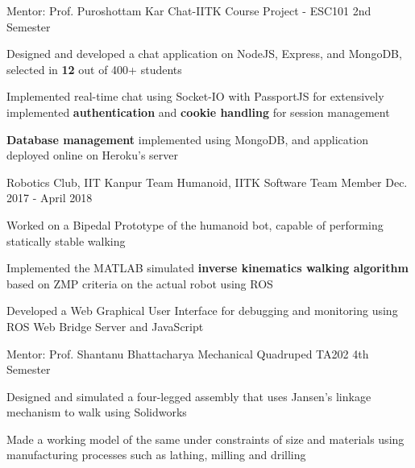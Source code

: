 \begin{cventries}
  \cventry
    {Mentor: Prof. Puroshottam Kar}
    {Chat-IITK}
    {Course Project - ESC101}
    {2nd Semester}
    {
      \begin{cvitems}
        \item {Designed and developed a chat application on NodeJS, Express, and MongoDB, selected in \textbf{12} out of 400+ students}
        \item {Implemented real-time chat using Socket-IO with PassportJS for extensively implemented \textbf{authentication} and \textbf{cookie handling} for session management}
        \item {\textbf{Database management} implemented using MongoDB, and application deployed online on Heroku's server}
      \end{cvitems}
    }

  \cventry
    {Robotics Club, IIT Kanpur}
    {Team Humanoid, IITK}
    {Software Team Member}
    {Dec. 2017 - April 2018} 
    {
      \begin{cvitems} 
        \item {Worked on a Bipedal Prototype of the humanoid bot, capable of performing statically stable walking}
        \item {Implemented the MATLAB simulated \textbf{inverse kinematics walking algorithm} based on ZMP criteria on the actual robot using ROS}
        \item {Developed a Web Graphical User Interface for debugging and monitoring using ROS Web Bridge Server and JavaScript}
      \end{cvitems}
    }


  \smallcventry
    {Mentor: Prof. Shantanu Bhattacharya}
    {Mechanical Quadruped}
    {TA202}
    {4th Semester}
    {}
    {
      \begin{cvitems}
        \item Designed and simulated a four-legged assembly that uses Jansen's linkage mechanism to walk using Solidworks
        \item Made a working model of the same under constraints of size and materials using manufacturing processes such as lathing, milling and drilling
      \end{cvitems}
    } 

\end{cventries}
\vspace{-2mm}



